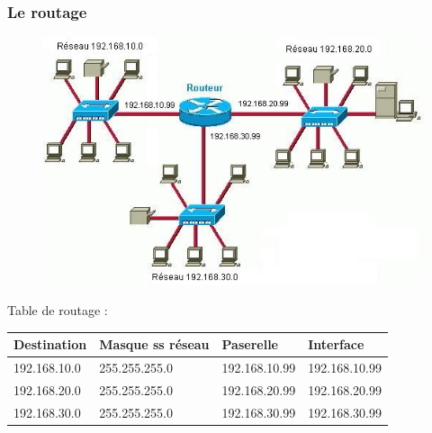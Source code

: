 \begin{frame}\frametitle{Le routage}

    \begin{figure}[H]
        \includegraphics[scale=0.35]{res/routageIP_1.png}
    \end{figure}
    Table de routage :
    \begin{table}[h]
        \begin{tabular}{l|l|l|l}
Destination   & Masque ss réseau  & Paserelle     & Interface   \\ \hline
192.168.10.0  & 255.255.255.0     & 192.168.10.99 & 192.168.10.99\\ \hline
192.168.20.0  & 255.255.255.0     & 192.168.20.99 & 192.168.20.99\\ \hline
192.168.30.0  & 255.255.255.0     & 192.168.30.99 & 192.168.30.99\\ 
        \end{tabular}
    \end{table}

\end{frame}


